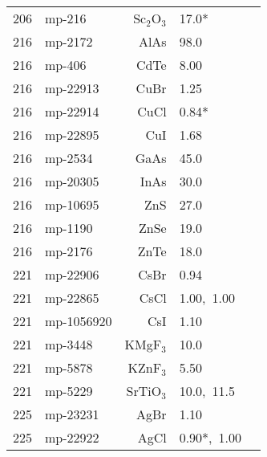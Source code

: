 \begin{table*}[ht]
\begin{center}
\begin{tabular}{rlrll}
     206 &      mp-216 &   Sc$_2$O$_3$ &            17.0* &          \cite{Li.2003} \\
     216 &     mp-2172 &          AlAs &            98.0 &     \cite{Morelli.2006} \\
     216 &      mp-406 &          CdTe &            8.00 &          \cite{Su.2015} \\
     216 &    mp-22913 &          CuBr &            1.25 &       \cite{perry2016} \\
     216 &    mp-22914 &          CuCl &            0.84* &       \cite{Slack.1982} \\
     216 &    mp-22895 &           CuI &            1.68 &       \cite{perry2016} \\
     216 &     mp-2534 &          GaAs &            45.0 &     \cite{Morelli.2006} \\
     216 &    mp-20305 &          InAs &            30.0 &     \cite{Morelli.2006} \\
     216 &    mp-10695 &           ZnS &            27.0 &     \cite{Morelli.2006} \\
     216 &     mp-1190 &          ZnSe &            19.0 &     \cite{Morelli.2006} \\
     216 &     mp-2176 &          ZnTe &            18.0 &     \cite{Morelli.2006} \\
     221 &    mp-22906 &          CsBr &            0.94 &     \cite{Gerlich.1982} \\
     221 &    mp-22865 &          CsCl &            1.00,~1.00 &     \cite{Gerlich.1982,Sist.2017} \\
     221 &  mp-1056920 &           CsI &            1.10 &     \cite{Gerlich.1982} \\
     221 &     mp-3448 &      KMgF$_3$ &            10.0 &      \cite{Martin.1976} \\
     221 &     mp-5878 &      KZnF$_3$ &            5.50 &     \cite{Suemune.1964} \\
     221 &     mp-5229 &     SrTiO$_3$ &            10.0,~11.5 &      \cite{Popuri.2014,Muta.2005} \\
     225 &    mp-23231 &          AgBr &            1.10 &      \cite{Kamran.2007} \\
     225 &    mp-22922 &          AgCl &            0.90*,~1.00 &        \cite{Ross.1981,Maqsood.2004} \\

\end{tabular}
\end{center}
\end{table*}
